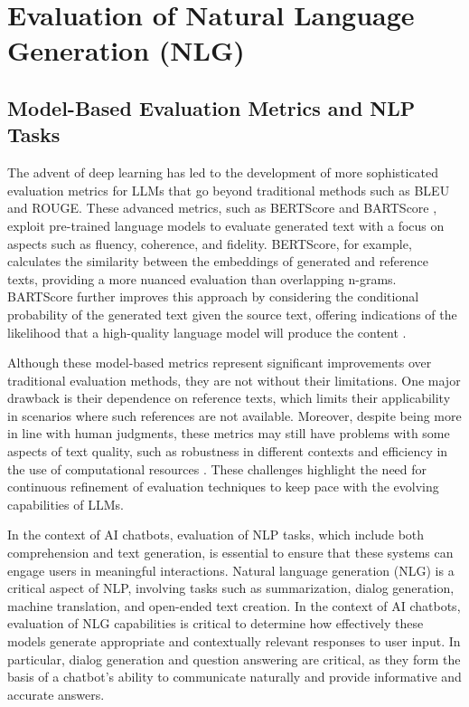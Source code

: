 \section{Evaluation of Natural Language Generation (NLG)}

\subsection{Model-Based Evaluation Metrics and NLP Tasks}

The advent of deep learning has led to the development of more sophisticated evaluation metrics for LLMs that go beyond traditional methods such as BLEU and ROUGE. These advanced metrics, such as BERTScore and BARTScore \cite{zhang2019bertscore, yuan2021bartscore}, exploit pre-trained language models to evaluate generated text with a focus on aspects such as fluency, coherence, and fidelity. BERTScore, for example, calculates the similarity between the embeddings of generated and reference texts, providing a more nuanced evaluation than overlapping n-grams. BARTScore further improves this approach by considering the conditional probability of the generated text given the source text, offering indications of the likelihood that a high-quality language model will produce the content \cite{gao2023retrieval}.

Although these model-based metrics represent significant improvements over traditional evaluation methods, they are not without their limitations. One major drawback is their dependence on reference texts, which limits their applicability in scenarios where such references are not available. Moreover, despite being more in line with human judgments, these metrics may still have problems with some aspects of text quality, such as robustness in different contexts and efficiency in the use of computational resources \cite{he2022blind}. These challenges highlight the need for continuous refinement of evaluation techniques to keep pace with the evolving capabilities of LLMs.

In the context of AI chatbots, evaluation of NLP tasks, which include both comprehension and text generation, is essential to ensure that these systems can engage users in meaningful interactions. Natural language generation (NLG) is a critical aspect of NLP, involving tasks such as summarization, dialog generation, machine translation, and open-ended text creation. In the context of AI chatbots, evaluation of NLG capabilities is critical to determine how effectively these models generate appropriate and contextually relevant responses to user input. In particular, dialog generation and question answering are critical, as they form the basis of a chatbot's ability to communicate naturally and provide informative and accurate answers.

